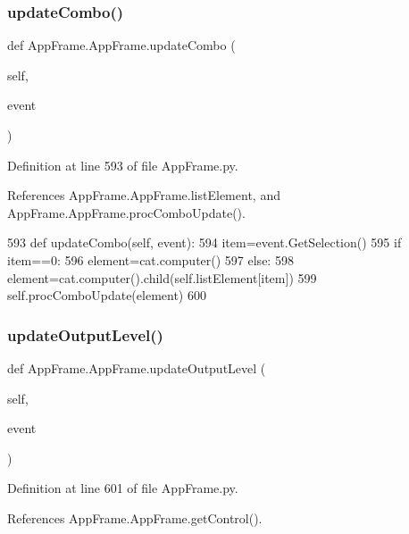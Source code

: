 \subsubsection{\texorpdfstring{update\+Combo()}{updateCombo()}}
{\footnotesize\ttfamily def App\+Frame.\+App\+Frame.\+update\+Combo (\begin{DoxyParamCaption}\item[{}]{self,  }\item[{}]{event }\end{DoxyParamCaption})}



Definition at line 593 of file App\+Frame.\+py.



References App\+Frame.\+App\+Frame.\+list\+Element, and App\+Frame.\+App\+Frame.\+proc\+Combo\+Update().


\begin{DoxyCode}
593     \textcolor{keyword}{def }updateCombo(self, event):
594         item=event.GetSelection()
595         \textcolor{keywordflow}{if} item==0:
596             element=cat.computer()
597         \textcolor{keywordflow}{else}:
598             element=cat.computer().child(self.listElement[item])
599         self.procComboUpdate(element)
600         
\end{DoxyCode}
\mbox{\label{classAppFrame_1_1AppFrame_a52d9ab5a01fd56a1d9acac223743086a}} 
\subsubsection{\texorpdfstring{update\+Output\+Level()}{updateOutputLevel()}}
{\footnotesize\ttfamily def App\+Frame.\+App\+Frame.\+update\+Output\+Level (\begin{DoxyParamCaption}\item[{}]{self,  }\item[{}]{event }\end{DoxyParamCaption})}



Definition at line 601 of file App\+Frame.\+py.



References App\+Frame.\+App\+Frame.\+get\+Control().


